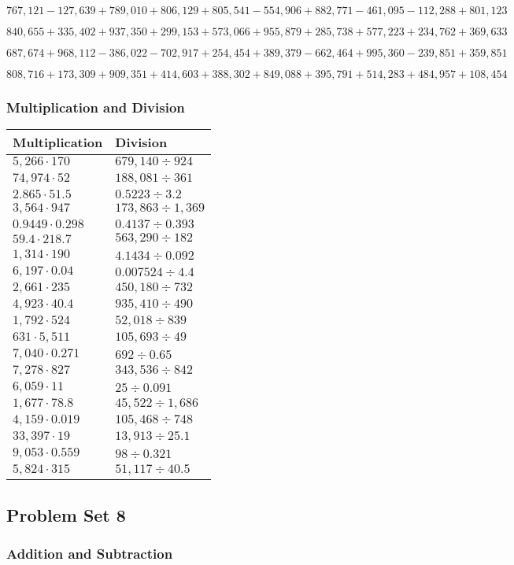 \(767,121-127,639+789,010+806,129+805,541-554,906+882,771-461,095-112,288+801,123\)

\(840,655+335,402+937,350+299,153+573,066+955,879+285,738+577,223+234,762+369,633\)

\(687,674+968,112-386,022-702,917+254,454+389,379-662,464+995,360-239,851+359,851\)

\(808,716+173,309+909,351+414,603+388,302+849,088+395,791+514,283+484,957+108,454\)

\hypertarget{multiplication-and-division-311}{%
\subsubsection{Multiplication and
Division}\label{multiplication-and-division-311}}

\begin{longtable}[]{@{}ll@{}}
\toprule
Multiplication & Division\tabularnewline
\midrule
\endhead
\(5,266\cdot170\) & \(679,140÷924\)\tabularnewline
\(74,974\cdot52\) & \(188,081÷361\)\tabularnewline
\(2.865\cdot51.5\) & \(0.5223÷3.2\)\tabularnewline
\(3,564\cdot947\) & \(173,863÷1,369\)\tabularnewline
\(0.9449\cdot0.298\) & \(0.4137÷0.393\)\tabularnewline
\(59.4\cdot218.7\) & \(563,290÷182\)\tabularnewline
\(1,314\cdot190\) & \(4.1434÷0.092\)\tabularnewline
\(6,197\cdot0.04\) & \(0.007524÷4.4\)\tabularnewline
\(2,661\cdot235\) & \(450,180÷732\)\tabularnewline
\(4,923\cdot40.4\) & \(935,410÷490\)\tabularnewline
\(1,792\cdot524\) & \(52,018÷839\)\tabularnewline
\(631\cdot5,511\) & \(105,693÷49\)\tabularnewline
\(7,040\cdot0.271\) & \(692÷0.65\)\tabularnewline
\(7,278\cdot827\) & \(343,536÷842\)\tabularnewline
\(6,059\cdot11\) & \(25÷0.091\)\tabularnewline
\(1,677\cdot78.8\) & \(45,522÷1,686\)\tabularnewline
\(4,159\cdot0.019\) & \(105,468÷748\)\tabularnewline
\(33,397\cdot19\) & \(13,913÷25.1\)\tabularnewline
\(9,053\cdot0.559\) & \(98÷0.321\)\tabularnewline
\(5,824\cdot315\) & \(51,117÷40.5\)\tabularnewline
\bottomrule
\end{longtable}

\hypertarget{problem-set-8-5}{%
\subsection{Problem Set 8}\label{problem-set-8-5}}

\hypertarget{addition-and-subtraction-313}{%
\subsubsection{Addition and
Subtraction}\label{addition-and-subtraction-313}}

